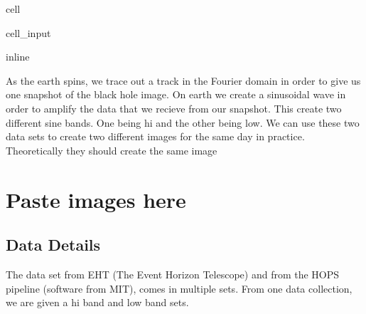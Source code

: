\documentclass[letterpaper,10pt,english]{jupyterBook}
\begin{document}
\begin{sphinxuseclass}{cell}\begin{sphinxVerbatimInput}

\begin{sphinxuseclass}{cell_input}
\begin{sphinxVerbatim}[commandchars=\\\{\}]
   
   
 
 
    
     
   
   
 
 inline
\end{sphinxVerbatim}

\end{sphinxuseclass}\end{sphinxVerbatimInput}

\end{sphinxuseclass}
\sphinxAtStartPar
As the earth spins, we trace out a track in the Fourier domain in order to give us one snapshot of the black hole image. On earth we create a sinusoidal wave in order to amplify the data that we recieve from our snapshot. This create two different sine bands. One being hi and the other being low. We can use these two data sets to create two different images for the same day in practice. Theoretically they should create the same image


\chapter{Paste images here}
\label{\detokenize{data:paste-images-here}}

\section{Data Details}
\label{\detokenize{data:data-details}}
\sphinxAtStartPar
The data set from EHT (The Event Horizon Telescope) and from the HOPS pipeline (software from MIT), comes in multiple sets. From one data collection, we are given a hi band and low band sets.
\end{document}
